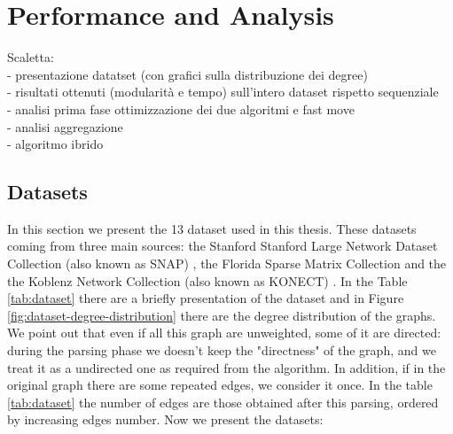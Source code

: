 \section{Performance and Analysis}
Scaletta:\\
- presentazione datatset (con grafici sulla distribuzione dei degree)\\
- risultati ottenuti (modularità e tempo) sull'intero dataset rispetto sequenziale\\
- analisi prima fase ottimizzazione dei due algoritmi e fast move\\
- analisi aggregazione\\
- algoritmo ibrido\\

\subsection{Datasets}
In this section we present the 13 dataset used in this thesis. These datasets coming from three main sources: the Stanford Stanford Large Network Dataset Collection (also known as SNAP) \cite{snap}, the Florida Sparse Matrix Collection \cite{florida-matrix} and the the Koblenz Network Collection (also known as KONECT)  \cite{konect}. In the Table \ref{tab:dataset} there are a briefly presentation of the dataset and in Figure \ref{fig:dataset-degree-distribution} there are the degree distribution of the graphs.  We point out that even if all this graph are unweighted, some of it are directed: during the parsing phase we doesn't keep the "directness" of the graph, and we treat it as a undirected one as required from the algorithm. In addition, if in the original graph there are some repeated edges, we consider it once. In the table \ref{tab:dataset} the number of edges are those obtained after this parsing, ordered by increasing edges number. Now we present the datasets:
